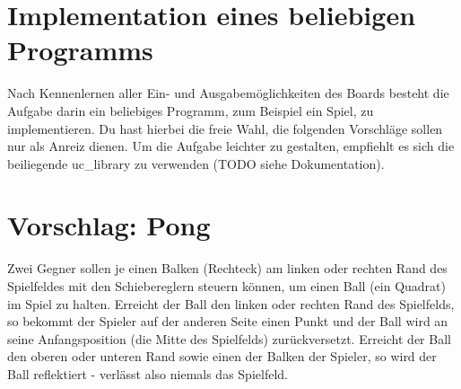 

\newcommand{\exday}{6}

\cppSetTitle



\cppSetHeaderAndMakeTitle

\section{Implementation eines beliebigen Programms}
Nach Kennenlernen aller Ein- und Ausgabemöglichkeiten des Boards besteht die Aufgabe darin ein beliebiges Programm, zum Beispiel ein Spiel, zu implementieren.
Du hast hierbei die freie Wahl, die folgenden Vorschläge sollen nur als Anreiz dienen.
Um die Aufgabe leichter zu gestalten, empfiehlt es sich die beiliegende uc\_library zu verwenden (TODO siehe Dokumentation).

\section*{Vorschlag: Pong}
Zwei Gegner sollen je einen Balken (Rechteck) am linken oder rechten Rand des Spielfeldes mit den Schiebereglern steuern können, um einen Ball (ein Quadrat) im Spiel zu halten.
Erreicht der Ball den linken oder rechten Rand des Spielfelds, so bekommt der Spieler auf der anderen Seite einen Punkt und der Ball wird an seine Anfangsposition (die Mitte des Spielfelds) zurückversetzt.
Erreicht der Ball den oberen oder unteren Rand sowie einen der Balken der Spieler, so wird der Ball reflektiert - verlässt also niemals das Spielfeld.

